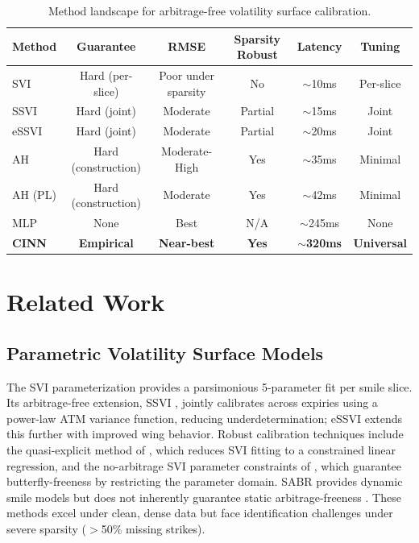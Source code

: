 \documentclass[11pt,a4paper]{article}
\begin{document}
\begin{table}[h]
\centering
\caption{Method landscape for arbitrage-free volatility surface calibration.}
\label{tab:positioning}
\begin{tabular}{lccccc}
\toprule
\textbf{Method} & \textbf{Guarantee} & \textbf{RMSE} & \textbf{Sparsity Robust} & \textbf{Latency} & \textbf{Tuning} \\
\midrule
SVI & Hard (per-slice) & Poor under sparsity & No & ${\sim}$10ms & Per-slice \\
SSVI & Hard (joint) & Moderate & Partial & ${\sim}$15ms & Joint \\
eSSVI & Hard (joint) & Moderate & Partial & ${\sim}$20ms & Joint \\
AH & Hard (construction) & Moderate-High & Yes & ${\sim}$35ms & Minimal \\
AH (PL) & Hard (construction) & Moderate & Yes & ${\sim}$42ms & Minimal \\
MLP & None & Best & N/A & ${\sim}$245ms & None \\
\textbf{CINN} & \textbf{Empirical} & \textbf{Near-best} & \textbf{Yes} & \textbf{${\sim}$320ms} & \textbf{Universal} \\
\bottomrule
\end{tabular}
\end{table}

\section{Related Work}
\label{sec:related}

\subsection{Parametric Volatility Surface Models}

The SVI parameterization \citep{gatheral2004} provides a parsimonious 5-parameter fit per smile slice. Its arbitrage-free extension, SSVI \citep{gatheral2014}, jointly calibrates across expiries using a power-law ATM variance function, reducing underdetermination; eSSVI \citep{hendriks2019} extends this further with improved wing behavior. Robust calibration techniques include the quasi-explicit method of \citet{demarco2009}, which reduces SVI fitting to a constrained linear regression, and the no-arbitrage SVI parameter constraints of \citet{martini2022}, which guarantee butterfly-freeness by restricting the parameter domain. SABR \citep{hagan2002} provides dynamic smile models but does not inherently guarantee static arbitrage-freeness \citep{roper2010}. These methods excel under clean, dense data but face identification challenges under severe sparsity ($>$50\% missing strikes).
\end{document}
